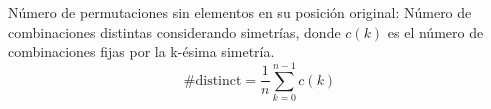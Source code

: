 \markdownRendererInterblockSeparator
{}Número de permutaciones sin elementos en su posición original:\markdownRendererInterblockSeparator
{}\markdownRendererInterblockSeparator
{}
\markdownRendererSectionEnd \markdownRendererSectionBegin
{}\markdownRendererInterblockSeparator
{}Número de combinaciones distintas considerando simetrías, donde $c(k)$ es el número de combinaciones fijas por la k-ésima simetría.\markdownRendererParagraphSeparator
{}$$\text{#distinct} = \frac{1}{n} \sum_{k=0}^{n-1} c(k)$$\markdownRendererInterblockSeparator
{}
\markdownRendererSectionEnd 
\markdownRendererSectionEnd \markdownRendererDocumentEnd
